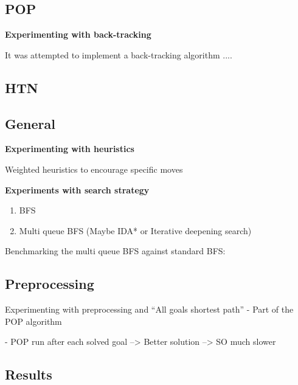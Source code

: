 \documentclass[Main]{subfiles}
\begin{document}
\subsection{POP}

\textbf{Experimenting with back-tracking}

It was attempted to implement a back-tracking algorithm ....






\subsection{HTN}





\subsection{General} 


\textbf{Experimenting with heuristics}

Weighted heuristics to encourage specific moves





\textbf{Experiments with search strategy}

\begin{enumerate}
    \item BFS 
    \item Multi queue BFS (Maybe IDA* or Iterative deepening search)
\end{enumerate}



Benchmarking the multi queue BFS against standard BFS:





\subsection{Preprocessing}
Experimenting with preprocessing and ``All goals shortest path'' 
- Part of the POP algorithm

- POP run after each solved goal 
--> Better solution --> SO much slower





\subsection{Results}
\end{document}

